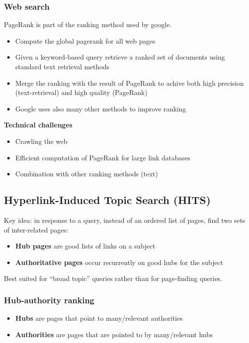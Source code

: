\subsubsection{Web search}
PageRank is part of the ranking method used by google.
\begin{itemize}
\item Compute the global pagerank for all web pages
\item Given a keyword-based query retrieve a ranked set of documents
  using standard text retrieval methods
\item Merge the ranking with the result of PageRank to achive both
  high precision (text-retrieval) and high quality (PageRank)
\item Google uses also many other methods to improve ranking
\end{itemize}

\textbf{Technical challenges}
\begin{itemize}
\item Crawling the web
\item Efficient computation of PageRank for large link databases
\item Combination with other ranking methods (text)
\end{itemize}

\subsection{Hyperlink-Induced Topic Search (HITS)}
Key idea: in response to a query, instead of an ordered list of pages,
find two sets of inter-related pages:
\begin{itemize}
\item \textbf{Hub pages} are good lists of links on a subject
\item \textbf{Authoritative pages} occur recurrently on good hubs for
  the subject
\end{itemize}

Best suited for ``broad topic'' queries rather than for page-finding
queries.

\subsubsection{Hub-authority ranking}

\begin{itemize}
\item \textbf{Hubs} are pages that point to many/relevant authorities
\item \textbf{Authorities} are pages that are pointed to by
  many/relevant hubs
\end{itemize}

